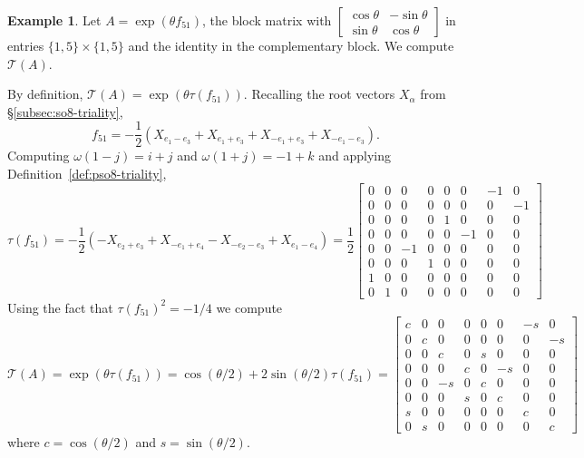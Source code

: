 \documentclass[reqno]{amsart}
\theoremstyle{definition} \newtheorem{example}[theorem]{Example}
\newcommand{\secsymbol}{§}
\newcommand{\T}{\mathcal{T}}
\begin{document}
\begin{example} \label{ex:pso8-triality}
Let $A = \exp(\theta f_{51})$, the block matrix with $\left[ \begin{smallmatrix} \cos \theta & -\sin \theta \\ \sin \theta & \cos \theta \end{smallmatrix} \right]$ in entries $\{1,5\} \times \{1,5\}$ and the identity in the complementary block. We compute $\T(A)$.

By definition, $\T(A) = \exp(\theta \tau(f_{51}))$.  Recalling the root vectors $X_{\alpha}$ from \secsymbol\ref{subsec:so8-triality}, 
\begin{equation*}
f_{51} = -\frac{1}{2}(X_{e_1-e_3} + X_{e_1+e_3} + X_{-e_1+e_3} + X_{-e_1-e_3}).
\end{equation*}
Computing $\omega(1-j) = i+j$ and $\omega(1+j) = -1+k$ and applying Definition~\ref{def:pso8-triality},
\begin{equation*}
\tau(f_{51}) = -\frac{1}{2}(-X_{e_2+e_3} + X_{-e_1+e_4} - X_{-e_2-e_3} + X_{e_1-e_4}) = \frac{1}{2} 
\left[\begin{smallmatrix}
0 & 0 & 0 & 0 & 0 & 0 & -1 & 0\\
0 & 0 & 0 & 0 & 0 & 0 & 0 & -1\\
0 & 0 & 0 & 0 & 1 & 0 & 0 & 0\\
0 & 0 & 0 & 0 & 0 & -1 & 0 & 0\\
0 & 0 & -1 & 0 & 0 & 0 & 0 & 0\\
0 & 0 & 0 & 1 & 0 & 0 & 0 & 0\\
1 & 0 & 0 & 0 & 0 & 0 & 0 & 0\\
0 & 1 & 0 & 0 & 0 & 0 & 0 & 0
\end{smallmatrix}\right]
\end{equation*}
Using the fact that $\tau(f_{51})^2 = -1/4$ we compute
\begin{equation*}
\T(A) = \exp(\theta \tau(f_{51})) = \cos(\theta/2) + 2\sin(\theta/2) \tau(f_{51}) = 
\left[\begin{smallmatrix}
c & 0 & 0 & 0 & 0 & 0 & -s & 0\\
0 & c & 0 & 0 & 0 & 0 & 0 & -s\\
0 & 0 & c & 0 & s & 0 & 0 & 0\\
0 & 0 & 0 & c & 0 & -s & 0 & 0\\
0 & 0 & -s & 0 & c & 0 & 0 & 0\\
0 & 0 & 0 & s & 0 & c & 0 & 0\\
s & 0 & 0 & 0 & 0 & 0 & c & 0\\
0 & s & 0 & 0 & 0 & 0 & 0 & c
\end{smallmatrix} \right]
\end{equation*}
where $c = \cos(\theta/2)$ and $s = \sin(\theta/2)$.
\end{example}
\end{document}
